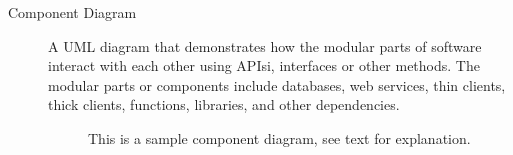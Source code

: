 \begin{description}
\item[Component Diagram] A UML diagram that demonstrates how the modular
parts of software interact with each other using APIsi, interfaces
or other methods. The modular parts or components include databases,
web services, thin clients, thick clients, functions, libraries, and
other dependencies.
\begin{figure}[h!]
\caption[Component Diagram Example]{
This is a sample component diagram, see text for explanation.}
\end{figure}


\end{description}
